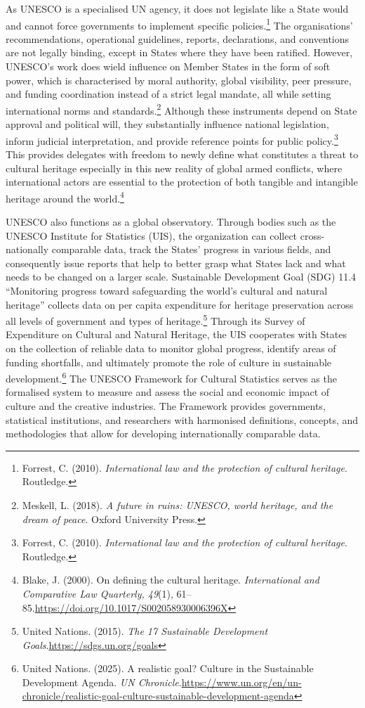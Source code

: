 As UNESCO is a specialised UN agency, it does not legislate like a State would and cannot force governments to implement specific policies.\footnote{Forrest, C. (2010). \emph{International law and the protection of cultural heritage}. Routledge.} The organisations’ recommendations,  operational guidelines, reports, declarations, and conventions are not legally binding, except in States where they have been ratified. However, UNESCO’s work does wield influence on Member States in the form of soft power, which is characterised by moral authority, global visibility, peer pressure, and funding coordination instead of a strict legal mandate, all while setting international norms and standards.\footnote{Meskell, L. (2018). \emph{A future in ruins: UNESCO, world heritage, and the dream of peace}. Oxford University Press.} Although these instruments depend on State approval and political will, they substantially influence national legislation, inform judicial interpretation, and provide reference points for public policy.\footnote{Forrest, C. (2010). \emph{International law and the protection of cultural heritage}. Routledge.} This provides delegates with freedom to newly define what constitutes a threat to cultural heritage especially in this new reality of global armed conflicts, where international actors are essential to the protection of both tangible and intangible heritage around the world.\footnote{Blake, J. (2000). On defining the cultural heritage. \emph{International and Comparative Law Quarterly, 49}(1), 61–85.\url{https://doi.org/10.1017/S002058930006396X}}

UNESCO also functions as a global observatory. Through bodies such as the UNESCO Institute for Statistics (UIS), the organization can collect cross-nationally comparable data, track the States’ progress in various fields, and consequently issue reports that help to better grasp what States lack and what needs to be changed on a larger scale. Sustainable Development Goal (SDG) 11.4 “Monitoring progress toward safeguarding the world’s cultural and natural heritage” collects data on per capita expenditure for heritage preservation across all levels of government and types of heritage.\footnote{United Nations. (2015). \emph{The 17 Sustainable Development Goals}.\url{https://sdgs.un.org/goals}} Through its Survey of Expenditure on Cultural and Natural Heritage, the UIS cooperates with States on the collection of reliable data to monitor global progress, identify areas of funding shortfalls, and ultimately promote the role of culture in sustainable development.\footnote{United Nations. (2025). A realistic goal? Culture in the Sustainable Development Agenda. \emph{UN Chronicle}.\url{https://www.un.org/en/un-chronicle/realistic-goal-culture-sustainable-development-agenda}} The UNESCO Framework for Cultural Statistics serves as the formalised system to measure and assess the social and economic impact of culture and the creative industries. The Framework provides governments, statistical institutions, and researchers with harmonised definitions, concepts, and methodologies that allow for developing internationally comparable data.


